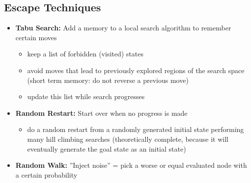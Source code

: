 \documentclass[conference]{styles/acmsiggraph}
\begin{document}
    \subsection{Escape Techniques}
        \begin{itemize}
            \item \textbf{Tabu Search:}
                Add a memory to a local search algorithm to remember certain moves
                \begin{itemize}
                    \item keep a list of forbidden (visited) states
                    \item avoid moves that lead to previously explored regions of the search space\newline
                        (short term memory: do not reverse a previous move)
                    \item update this list while search progresses
                \end{itemize}
            \item \textbf{Random Restart:}
                Start over when no progress is made
                \begin{itemize}
                    \item do a random restart from a randomly generated initial state performing many hill climbing searches\newline
                        (theoretically complete, because it will eventually generate the goal state as an initial state)
                \end{itemize}
            \item \textbf{Random Walk:} 
                ''Inject noise'' = pick a worse or equal evaluated node with a certain probability
        \end{itemize}
    
    
\end{document}
